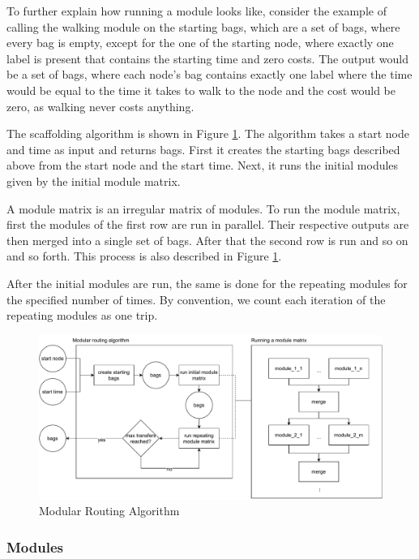 To further explain how running a module looks like, consider the example of calling the walking module on the starting bags, which are a set of bags, where every bag is empty, except for the one of the starting node, where exactly one label is present that contains the starting time and zero costs.
The output would be a set of bags, where each node's bag contains exactly one label where the time would be equal to the time it takes to walk to the node and the cost would be zero, as walking never costs anything.

The scaffolding algorithm is shown in Figure \ref{fig:modular_routing_algorithm}.
The algorithm takes a start node and time as input and returns bags.
First it creates the starting bags described above from the start node and the start time.
Next, it runs the initial modules given by the initial module matrix.

A module matrix is an irregular matrix of modules.
To run the module matrix, first the modules of the first row are run in parallel.
Their respective outputs are then merged into a single set of bags.
After that the second row is run and so on and so forth.
This process is also described in Figure \ref{fig:modular_routing_algorithm}.

After the initial modules are run, the same is done for the repeating modules for the specified number of times.
By convention, we count each iteration of the repeating modules as one trip.

\begin{figure}
    \centering
    \includegraphics[scale=0.40]{Figures/method/modular_routing_algorithm}
    \caption{Modular Routing Algorithm}
    \label{fig:modular_routing_algorithm}
\end{figure}


\subsubsection{Modules}
\label{subsubsec:modules}

